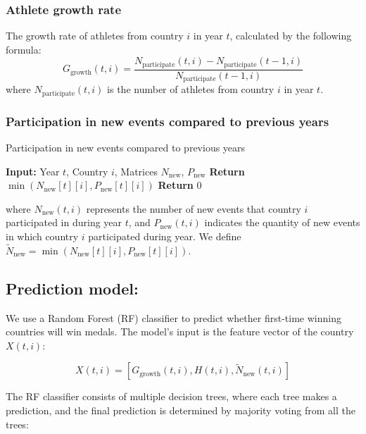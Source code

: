 \documentclass{mcmthesis}
\begin{document}
	\subsubsection{Athlete growth rate}
	The growth rate of athletes from country $i$ in year $t$, calculated by the following formula:
	\[
	G_{\text{growth}}(t,i) = \frac{N_{\text{participate}}(t,i) - N_{\text{participate}}(t-1,i)}{N_{\text{participate}}(t-1,i)}
	\]
	where $N_{\text{participate}}(t,i)$ is the number of athletes from country $i$ in year $t$.
	
	
	\subsubsection{Participation in new events compared to previous years} 
	\begin{algorithm}[]
		\caption{Participation in new events compared to previous years}
		\begin{algorithmic}[1]
			\State \textbf{Input:} Year \( t \), Country \( i \), Matrices \( N_{\text{new}} \), \( P_{\text{new}} \)
			\State \textbf{Return} $\min(N_{\text{new}}[t][i], P_{\text{new}}[t][i])$
			\EndIf
			\EndFor
			\State \textbf{Return} 0
		\end{algorithmic}
	\end{algorithm}
	
	where \( N_{\text{new}}(t,i) \) represents the number of new events that country \( i \) participated in during year \( t \), and \( P_{\text{new}}(t,i) \) indicates the quantity of new events in which country \(i\) participated during year. We define \( \tilde{N}_{\text{new}} = \min(N_{\text{new}}[t][i], P_{\text{new}}[t][i]) \).
	
	
	
	
	

\subsection{Prediction model:}  
We use a Random Forest (RF) classifier to predict whether first-time winning countries will win medals. The model’s input is the feature vector of the country \( X(t,i) \):

\[
X(t,i) = [G_{\text{growth}}(t,i), H(t,i), \tilde{N}_{\text{new}}(t,i)]
\]

The RF classifier consists of multiple decision trees, where each tree makes a prediction, and the final prediction is determined by majority voting from all the trees:
\end{document}
